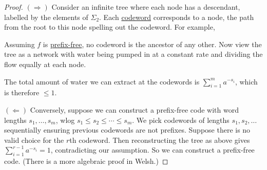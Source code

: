 \documentclass{article}
\newcommand{\1}[1]{\mathbbm{1}_{#1}}
\begin{document}
\begin{proof}
    $(\Rightarrow)$ Consider an infinite tree where each node has a descendant, labelled by the elements of $\Sigma_2$.
    Each \hyperlink{def:code}{codeword} corresponds to a node, the path from the root to this node spelling out the codeword.
    For example,
    \begin{center}
    \end{center}
    Assuming $f$ is \hyperlink{def:prefixFreeCode}{prefix-free}, no codeword is the ancestor of any other. Now view the tree as a network with water being pumped in at a constant rate and dividing the flow equally at each node.

    The total amount of water we can extract at the codewords is $\sum_{i=1}^m a^{-s_i}$, which is therefore $\leq 1$.

    $(\Leftarrow)$ Conversely, suppose we can construct a prefix-free code with word lengths $s_1, \dotsc, s_m$, wlog $s_1 \leq s_2 \leq \dotsb \leq s_m$.
    We pick codewords of lengths $s_1, s_2, \dotsc$ sequentially ensuring previous codewords are not prefixes.
    Suppose there is no valid choice for the $r$th codeword.
    Then reconstructing the tree as above gives $ \sum_{i=1}^{r-1} a^{-s_i} = 1 $, contradicting our assumption.
    So we can construct a prefix-free code. (There is a more algebraic proof in Welsh.)
\end{proof}
\end{document}
